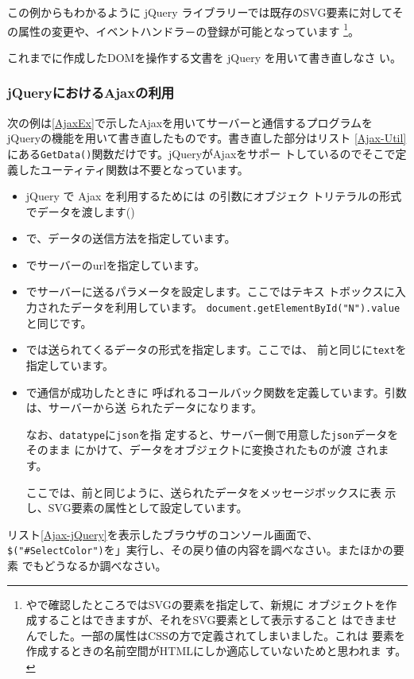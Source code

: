 この例からもわかるように jQuery ライブラリーでは既存のSVG要素に対してそ
の属性の変更や、イベントハンドラ－の登録が可能となっています
\footnote{\Operan や\FF で確認したところではSVGの要素を指定して、新規に
オブジェクトを作成することはできますが、それをSVG要素として表示すること
はできませんでした。一部の属性はCSSの方で定義されてしまいました。これは
要素を作成するときの名前空間がHTMLにしか適応していないためと思われま
す。}。
\begin{Problem}\upshape
 これまでに作成したDOMを操作する\HTML 文書を jQuery を用いて書き直しなさ
 い。
\end{Problem}
\subsubsection{jQueryにおけるAjaxの利用}
次の例は\ref{AjaxEx}で示したAjaxを用いてサーバーと通信するプログラムを
jQueryの機能を用いて書き直したものです。書き直した部分はリスト
\ref{Ajax-Util}にある\texttt{GetData()}関数だけです。jQueryがAjaxをサポー
トしているのでそこで定義したユーティティ関数は不要となっています。

\begin{itemize}
 \item jQuery で Ajax を利用するためには  の引数にオブジェク
			 トリテラルの形式でデータを渡します()
 \item {}で、データの送信方法を指定しています。
 \item {}でサーバーのurlを指定しています。
 \item {}でサーバーに送るパラメータを設定します。ここではテキス
			 トボックスに入力されたデータを利用しています。
			 \texttt{document.getElementById("N").value}と同じです。
 \item {}では送られてくるデータの形式を指定します。ここでは、
			 前と同じに\texttt{text}を指定しています。

 \item {}で通信が成功したときに
			 呼ばれるコールバック関数を定義しています。引数は、サーバーから送
			 られたデータになります。
			 
			 なお、\texttt{datatype}に\texttt{json}を指
			 定すると、サーバー側で用意した\texttt{json}データをそのまま
			 にかけて、データをオブジェクトに変換されたものが渡
			 されます。

			 ここでは、前と同じように、送られたデータをメッセージボックスに表
			 示し、SVG要素の属性として設定しています。
\end{itemize}
\begin{Problem}\upshape
リスト\ref{Ajax-jQuery}を表示したブラウザのコンソール画面で、
 \texttt{\$("\#SelectColor")}を」実行し、その戻り値の内容を調べなさい。またほかの要素
 でもどうなるか調べなさい。
\end{Problem}
